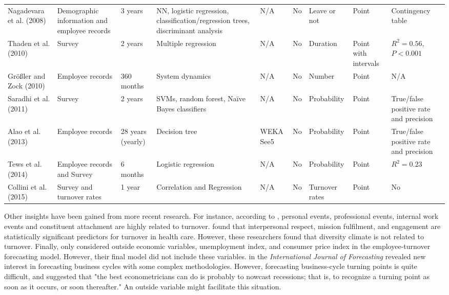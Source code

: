 \begin{landscape}
\begin{table}[htbp]
\begin{tabular}{L{2.8cm}  L{2.8cm}  C{1.2cm}  L{3cm} C{1.2cm}  C{1.5cm} C{1.5cm} C{1.5cm}  L{2.8cm}}
			Nagadevara et al. (2008) & Demographic information and employee records & 3 years & NN, logistic regression, classification/regression trees, discriminant analysis & N/A   & No    & Leave or not & Point & Contingency table \\
			
			Thaden et al. (2010) & Survey & 2 years & Multiple regression & N/A   & No    & Duration & Point with intervals &  $R^2=0.56$, $P< 0.001$ \\
			
			Größler and Zock (2010) & Employee records & 360 months & System dynamics  & N/A   & No    & Number & Point & N/A \\
			
			Saradhi et al. (2011) & Survey & 2 years & SVMs, random forest,  Naïve Bayes classifiers & N/A   & No    & Probability  & Point & True/false positive rate and precision \\
			
			Alao et al. (2013) &  Employee records   & 28 years (yearly) & Decision tree & WEKA See5 & No    & Probability  & Point & True/false positive rate and precision \\
			Tews et al. (2014) & Employee records and Survey & 6 months & Logistic regression & N/A   & No    & Probability & Point & $R^2=0.23$ \\
			Collini et al. (2015) & Survey and turnover rates   & 1 year & Correlation and Regression & N/A   & No    & Turnover rates & Point & No \\
			
			\bottomrule
		\end{tabular}%
		\label{tab:1}%
	\end{table}%
\end{landscape}
Other insights have been gained from more recent research. For instance, according to \citet{tews2014}, personal events, professional events, internal work events and constituent attachment are highly related to turnover. \citet{collini2015} found that interpersonal respect, mission fulfilment, and engagement are statistically significant predictors for turnover in health care. However, these researchers found that diversity climate is not related to turnover. Finally, only \citet{sexton2005} considered outside economic variables, unemployment index, and consumer price index in the employee-turnover forecasting model. However, their final model did not include these variables.  
\citet{ferrara2014} in the {\it International Journal of Forecasting} revealed new interest in forecasting business cycles with some complex methodologies. However, forecasting business-cycle turning points is quite difficult, and \citet{hamilton2011} suggested that "the best econometricians can do is probably to nowcast recessions; that is, to recognize a turning point as soon as it occurs, or soon thereafter." An outside variable might facilitate this situation.

